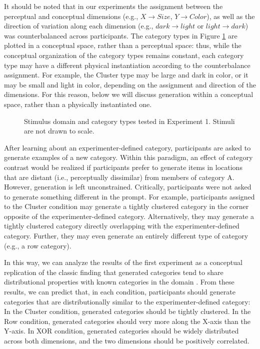 \documentclass[12pt]{article}
\newcommand\inputpgf[2]{{
\let\pgfimageWithoutPath\pgfimage
\renewcommand{\pgfimage}[2][]{\pgfimageWithoutPath[##1]{#1/##2}}

}}
\begin{document}
\begin{flushleft}
It should be noted that in our experiments the assignment between the perceptual and conceptual dimensions (e.g., $X \rightarrow Size$, $Y \rightarrow Color$), as well as the direction of variation along each dimension (e.g., $dark \rightarrow light$ or $light \rightarrow dark$) was counterbalanced across participants. The category types in Figure \ref{fig:e1-conditions} are plotted in a conceptual space, rather than a perceptual space: thus, while the conceptual organization of the category types remains constant, each category type may have a different physical instantiation according to the counterbalance assignment. For example, the Cluster type  may be large and dark in color, or it may be small and light in color, depending on the assignment and direction of the dimensions. For this reason, below we will discuss generation within a conceptual space, rather than a physically instantiated one.

\begin{figure}
    \begin{center}
    \inputpgf{figs/}{e1-conditions.pgf}
    \caption{Stimulus domain and category types tested in Experiment 1. Stimuli are not drawn to scale.}
    \label{fig:e1-conditions}
    \end{center}
\end{figure}

After learning about an experimenter-defined category, participants are asked to generate examples of a new category. Within this paradigm, an effect of category contrast would be realized if participants prefer to generate items in locations that are distant (i.e., perceptually dissimilar) from members of category A. However, generation is left unconstrained. Critically, participants were not asked to generate something different in the prompt. For example, participants assigned to the Cluster condition may generate a tightly clustered category in the corner opposite of the experimenter-defined category. Alternatively, they may generate a tightly clustered category directly overlapping with the experimenter-defined category. Further, they may even generate an entirely different type of category (e.g., a row category). 

In this way, we can analyze the results of the first experiment as a conceptual replication of the classic finding that generated categories tend to share distributional properties with known categories in the domain \citep[see][]{jern2013probabilistic,ward1994structured}. From these results, we can predict that, in each condition, participants should generate categories that are distributionally similar to the experimenter-defined category: In the Cluster condition, generated categories should be tightly clustered. In the Row condition, generated categories should very more along the X-axis than the Y-axis. In XOR condition, generated categories should be widely distributed across both dimensions, and the two dimensions should be positively correlated. 


\end{flushleft}
\end{document}
